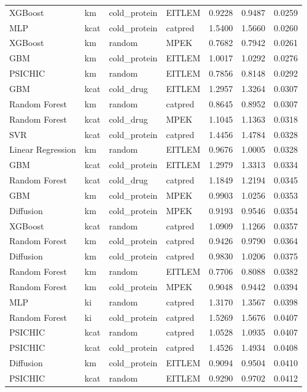 \begin{tabular}{llllrrr}
XGBoost & km & cold_protein & EITLEM & 0.9228 & 0.9487 & 0.0259 \\
MLP & kcat & cold_protein & catpred & 1.5400 & 1.5660 & 0.0260 \\
XGBoost & km & random & MPEK & 0.7682 & 0.7942 & 0.0261 \\
GBM & km & cold_protein & EITLEM & 1.0017 & 1.0292 & 0.0276 \\
PSICHIC & km & random & EITLEM & 0.7856 & 0.8148 & 0.0292 \\
GBM & kcat & cold_drug & EITLEM & 1.2957 & 1.3264 & 0.0307 \\
Random Forest & km & random & catpred & 0.8645 & 0.8952 & 0.0307 \\
Random Forest & kcat & cold_drug & MPEK & 1.1045 & 1.1363 & 0.0318 \\
SVR & kcat & cold_protein & catpred & 1.4456 & 1.4784 & 0.0328 \\
Linear Regression & km & random & EITLEM & 0.9676 & 1.0005 & 0.0328 \\
GBM & kcat & cold_protein & EITLEM & 1.2979 & 1.3313 & 0.0334 \\
Random Forest & kcat & cold_drug & catpred & 1.1849 & 1.2194 & 0.0345 \\
GBM & km & cold_protein & MPEK & 0.9903 & 1.0256 & 0.0353 \\
Diffusion & km & cold_protein & MPEK & 0.9193 & 0.9546 & 0.0354 \\
XGBoost & kcat & random & catpred & 1.0909 & 1.1266 & 0.0357 \\
Random Forest & km & cold_protein & catpred & 0.9426 & 0.9790 & 0.0364 \\
Diffusion & km & cold_protein & catpred & 0.9830 & 1.0206 & 0.0375 \\
Random Forest & km & random & EITLEM & 0.7706 & 0.8088 & 0.0382 \\
Random Forest & km & cold_protein & MPEK & 0.9048 & 0.9442 & 0.0394 \\
MLP & ki & random & catpred & 1.3170 & 1.3567 & 0.0398 \\
Random Forest & ki & cold_protein & catpred & 1.5269 & 1.5676 & 0.0407 \\
PSICHIC & kcat & random & catpred & 1.0528 & 1.0935 & 0.0407 \\
PSICHIC & kcat & cold_protein & catpred & 1.4526 & 1.4934 & 0.0408 \\
Diffusion & km & cold_protein & EITLEM & 0.9094 & 0.9504 & 0.0410 \\
PSICHIC & kcat & random & EITLEM & 0.9290 & 0.9702 & 0.0412 \\

\end{tabular}
